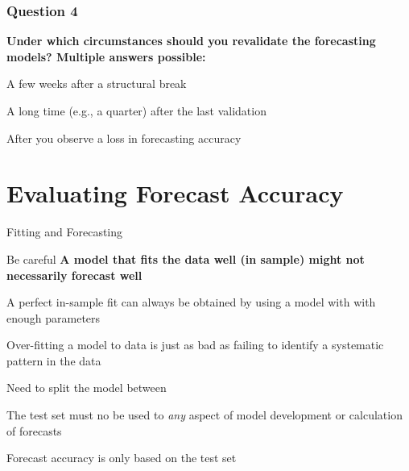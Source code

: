 \documentclass{beamer}
\newenvironment{wideitemize}{\itemize\addtolength{\itemsep}{10pt}}{\enditemize}
\newenvironment{wideenumerate}{\enumerate\addtolength{\itemsep}{10pt}}{\endenumerate}
\begin{document}
\begin{frame}
  \frametitle{Question 4}

\textbf{Under which circumstances should you revalidate the forecasting models? Multiple answers possible:}\\

  \bigskip

  \begin{wideenumerate}
    \item A few weeks after a structural break
    \item A long time (e.g., a quarter) after the last validation
    \item After you observe a loss in forecasting accuracy
  \end{wideenumerate}
  
\end{frame}

\section{Evaluating Forecast Accuracy}

\begin{frame}{Fitting and Forecasting}

  \begin{alertblock}{Be careful}
    \textbf{A model that fits the data well (in sample) might not necessarily forecast well}
  \end{alertblock}

  \medskip
  
  \begin{wideitemize}
    \item A perfect in-sample fit can always be obtained by using a model with with enough parameters
    \item Over-fitting a model to data is just as bad as failing to identify a systematic pattern in the data
    \item Need to split the model between 
    \item The test set must no be used to \emph{any} aspect of model development or calculation of forecasts
    \item Forecast accuracy is only based on the test set
  \end{wideitemize}  
\end{frame}
\end{document}
